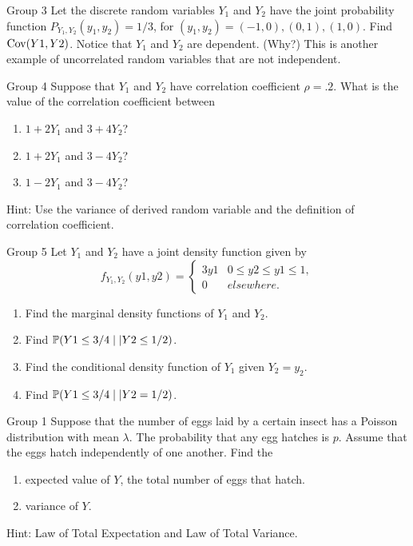 \documentclass{article}
\begin{document}
\begin{problem}
    {Group 3}
    Let the discrete random variables $Y_1$ and $Y_2$ have the joint probability function $P_{Y_1,Y_2}(y_1, y_2) = 1/3$, for $(y_1, y_2) = (-1, 0), (0, 1), (1, 0)$. Find $\mathop{\mathrm{Cov}}\nolimits(Y1, Y2)$. Notice that $Y_1$ and $Y_2$ are dependent. (Why?) This is another example of uncorrelated random variables that are not independent.
\end{problem}

\begin{problem}
    {Group 4}
    Suppose that $Y_1$ and $Y_2$ have correlation coefficient $\rho = .2$. What is the value of the correlation coefficient between
    \begin{enumerate}
        \item $1 + 2Y_1$ and $3 + 4Y_2$?
        \item $1 + 2Y_1$ and $3 - 4Y_2$?
        \item $1 - 2Y_1$ and $3 - 4Y_2$?
    \end{enumerate}
    \begin{solution}
        {Hint:}
        Use the variance of derived random variable and the definition of correlation coefficient.
    \end{solution}
\end{problem}

\begin{problem}
    {Group 5}
    Let $Y_1$ and $Y_2$ have a joint density function given by
    \[
        f_{Y_1,Y_2} (y1, y2) = {
            \begin{cases}
                3y1 & 0 \leq y2 \leq y1 \leq 1,\\
                0 & elsewhere.
            \end{cases}
        }
    \]
    \begin{enumerate}
        \item Find the marginal density functions of $Y_1$ and $Y_2$.
        \item Find $\condP{Y1 \leq 3/4}{|Y2 \leq 1/2}$.
        \item Find the conditional density function of $Y_1$ given $Y_2 = y_2$.
        \item Find $\condP{Y1 \leq 3/4}{|Y2 = 1/2}$.
    \end{enumerate}
\end{problem}
\fi
\iffalse
\begin{problem}
    {Group 1}
    Suppose that the number of eggs laid by a certain insect has a Poisson distribution with mean $\lambda$. The probability that any egg hatches is $p$. Assume that the eggs hatch independently of one another. Find the
    \begin{enumerate}
        \item expected value of $Y$, the total number of eggs that hatch.
        \item variance of $Y$.
    \end{enumerate}
    \begin{solution}
        {Hint:}
        Law of Total Expectation and Law of Total Variance.
    \end{solution}
\end{problem}
\end{document}
